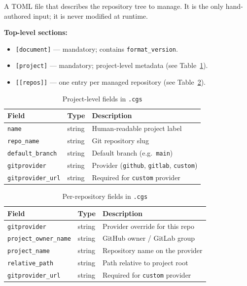 \documentclass[11pt,a4paper]{article}
\begin{document}
A TOML file that describes the repository tree to manage. It is the only
hand-authored input; it is never modified at runtime.

\textbf{Top-level sections:}

\begin{itemize}
  \item \texttt{[document]} — mandatory; contains \texttt{format\_version}.
  \item \texttt{[project]} — mandatory; project-level metadata (see
        Table~\ref{tab:project-fields}).
  \item \texttt{[[repos]]} — one entry per managed repository
        (see Table~\ref{tab:repo-fields}).
\end{itemize}

\begin{table}[h]
\centering
\begin{tabular}{lll}
\hline
\textbf{Field} & \textbf{Type} & \textbf{Description} \\
\hline
\texttt{name}           & string  & Human-readable project label \\
\texttt{repo\_name}     & string  & Git repository slug \\
\texttt{default\_branch}& string  & Default branch (e.g.\ \texttt{main}) \\
\texttt{gitprovider}    & string  & Provider (\texttt{github}, \texttt{gitlab}, \texttt{custom}) \\
\texttt{gitprovider\_url}& string & Required for \texttt{custom} provider \\
\hline
\end{tabular}
\caption{Project-level fields in \texttt{.cgs}}
\label{tab:project-fields}
\end{table}

\begin{table}[h]
\centering
\begin{tabular}{lll}
\hline
\textbf{Field} & \textbf{Type} & \textbf{Description} \\
\hline
\texttt{gitprovider}         & string  & Provider override for this repo \\
\texttt{project\_owner\_name}& string  & GitHub owner / GitLab group \\
\texttt{project\_name}       & string  & Repository name on the provider \\
\texttt{relative\_path}      & string  & Path relative to project root \\
\texttt{gitprovider\_url}    & string  & Required for \texttt{custom} provider \\
\hline
\end{tabular}
\caption{Per-repository fields in \texttt{.cgs}}
\label{tab:repo-fields}
\end{table}
\end{document}
